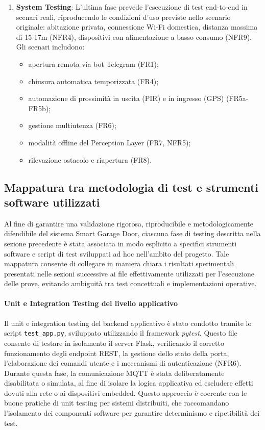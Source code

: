 \begin{enumerate}
    \item \textbf{System Testing}: L'ultima fase prevede l'esecuzione di test end-to-end in scenari reali, riproducendo le condizioni d'uso previste nello scenario originale: abitazione privata, connessione Wi-Fi domestica, distanza massima di 15-17m (NFR4), dispositivi con alimentazione a basso consumo (NFR9). Gli scenari includono:
    \begin{itemize}
        \item apertura remota via bot Telegram (FR1);
        \item chiusura automatica temporizzata (FR4);
        \item automazione di prossimità in uscita (PIR) e in ingresso (GPS) (FR5a-FR5b);
        \item gestione multiutenza (FR6);
        \item modalità offline del Perception Layer (FR7, NFR5);
        \item rilevazione ostacolo e riapertura (FR8).
    \end{itemize}
\end{enumerate}

\subsection{Mappatura tra metodologia di test e strumenti software utilizzati}
Al fine di garantire una validazione rigorosa, riproducibile e metodologicamente difendibile del sistema Smart Garage Door, ciascuna fase di testing descritta nella sezione precedente è stata associata in modo esplicito a specifici strumenti software e script di test sviluppati ad hoc nell’ambito del progetto. Tale mappatura consente di collegare in maniera chiara i risultati sperimentali presentati nelle sezioni successive ai file effettivamente utilizzati per l’esecuzione delle prove, evitando ambiguità tra test concettuali e implementazioni operative.

\paragraph{Unit e Integration Testing del livello applicativo}
Il unit e integration testing del backend applicativo è stato condotto tramite lo script \texttt{test\_app.py}, sviluppato utilizzando il framework \textit{pytest}. Questo file consente di testare in isolamento il server Flask, verificando il corretto funzionamento degli endpoint REST, la gestione dello stato della porta, l’elaborazione dei comandi utente e i meccanismi di autenticazione (NFR6).
Durante questa fase, la comunicazione MQTT è stata deliberatamente disabilitata o simulata, al fine di isolare la logica applicativa ed escludere effetti dovuti alla rete o ai dispositivi embedded. Questo approccio è coerente con le buone pratiche di unit testing per sistemi distribuiti, che raccomandano l’isolamento dei componenti software per garantire determinismo e ripetibilità dei test.

